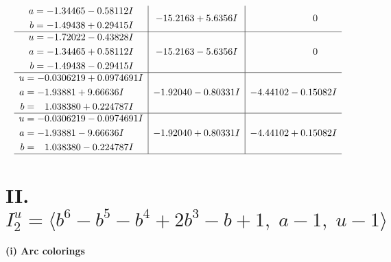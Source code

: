 \documentclass[1p]{elsarticle_modified}
\theoremstyle{definition}
\begin{document}
$$\begin{array}{c|c|c}
\begin{aligned}
a &= -1.34465 - 0.58112 I \\
b &= -1.49438 + 0.29415 I\end{aligned}
 & -15.2163 + 5.6356 I & \phantom{-0.000000 } 0 \\ \hline\begin{aligned}
u &= -1.72022 - 0.43828 I \\
a &= -1.34465 + 0.58112 I \\
b &= -1.49438 - 0.29415 I\end{aligned}
 & -15.2163 - 5.6356 I & \phantom{-0.000000 } 0 \\ \hline\begin{aligned}
u &= -0.0306219 + 0.0974691 I \\
a &= -1.93881 + 9.66636 I \\
b &= \phantom{-}1.038380 + 0.224787 I\end{aligned}
 & -1.92040 - 0.80331 I & -4.44102 - 0.15082 I \\ \hline\begin{aligned}
u &= -0.0306219 - 0.0974691 I \\
a &= -1.93881 - 9.66636 I \\
b &= \phantom{-}1.038380 - 0.224787 I\end{aligned}
 & -1.92040 + 0.80331 I & -4.44102 + 0.15082 I\\
 \hline 
 \end{array}$$\newpage\newpage\renewcommand{\arraystretch}{1}
\centering \section*{II. $I^u_{2}= \langle b^6- b^5- b^4+2 b^3- b+1,\;a-1,\;u-1 \rangle$}
\flushleft \textbf{(i) Arc colorings}\\
\end{document}
